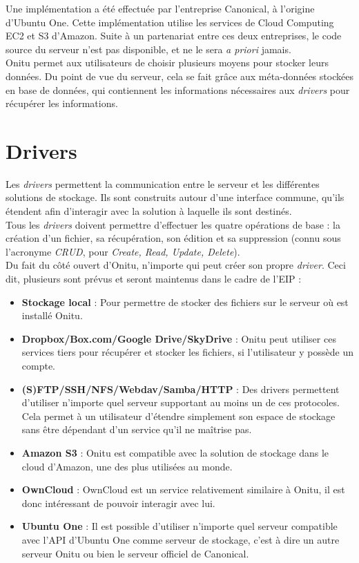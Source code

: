 Une implémentation a été effectuée par l'entreprise Canonical, à l'origine d'Ubuntu One. Cette implémentation utilise les services de Cloud Computing EC2 et S3 d'Amazon. Suite à un partenariat entre ces deux entreprises, le code source du serveur n'est pas disponible, et ne le sera \textit{a priori} jamais.\\

Onitu permet aux utilisateurs de choisir plusieurs moyens pour stocker leurs données. Du point de vue du serveur, cela se fait grâce aux méta-données stockées en base de données, qui contiennent les informations nécessaires aux \textit{drivers} pour récupérer les informations.\\

\section{Drivers}
Les \textit{drivers} permettent la communication entre le serveur et les différentes solutions de stockage. Ils sont construits autour d'une interface commune, qu'ils étendent afin d'interagir avec la solution à laquelle ils sont destinés.\\

Tous les \textit{drivers} doivent permettre d'effectuer les quatre opérations de base : la création d'un fichier, sa récupération, son édition et sa suppression (connu sous l'acronyme \textit{CRUD}, pour \textit{Create, Read, Update, Delete}).\\

Du fait du côté ouvert d'Onitu, n'importe qui peut créer son propre \textit{driver}. Ceci dit, plusieurs sont prévus et seront maintenus dans le cadre de l'EIP :
\begin{itemize}
\renewcommand{\labelitemi}{$\bullet$}
    \item \textbf{Stockage local} : Pour permettre de stocker des fichiers sur le serveur où est installé Onitu.
    \item \textbf{Dropbox/Box.com/Google Drive/SkyDrive} : Onitu peut utiliser ces services tiers pour récupérer et stocker les fichiers, si l'utilisateur y possède un compte.
    \item \textbf{(S)FTP/SSH/NFS/Webdav/Samba/HTTP} : Des drivers permettent d'utiliser n'importe quel serveur supportant au moins un de ces protocoles. Cela permet à un utilisateur d'étendre simplement son espace de stockage sans être dépendant d'un service qu'il ne maîtrise pas.
    \item \textbf{Amazon S3} : Onitu est compatible avec la solution de stockage dans le cloud d'Amazon, une des plus utilisées au monde.
    \item \textbf{OwnCloud} : OwnCloud est un service relativement similaire à Onitu, il est donc intéressant de pouvoir interagir avec lui.
    \item \textbf{Ubuntu One} : Il est possible d'utiliser n'importe quel serveur compatible avec l'API d'Ubuntu One comme serveur de stockage, c'est à dire un autre serveur Onitu ou bien le serveur officiel de Canonical.
\end{itemize}

